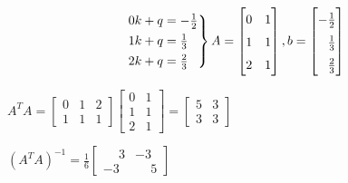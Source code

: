 \[
\begin{rcases*}
    0k + q = -\frac{1}{2} \\
    1k + q = \frac{1}{3} \\
    2k + q = \frac{2}{3}
\end{rcases*} 
A = 
\begin{bmatrix}
    0 & 1 \\
    1 & 1 \\
    2 & 1
\end{bmatrix},
b = 
\begingroup
    \renewcommand*{\arraystretch}{1.5}
    \begin{bmatrix}
        -\frac{1}{2} \\
        \phantom{-}\frac{1}{3} \\
        \phantom{-}\frac{2}{3}
    \end{bmatrix}
\endgroup
\]

$A^T A = 
\begin{bmatrix}
    0 & 1 & 2 \\
    1 & 1 & 1
\end{bmatrix}
\begin{bmatrix}
    0 & 1 \\
    1 & 1 \\
    2 & 1 
\end{bmatrix} =
\begin{bmatrix}
    5 & 3 \\
    3 & 3
\end{bmatrix}$

$(A^T A)^{-1} = \frac{1}{6}
\begin{bmatrix}
    \phantom{-}3 & -3 \\
    -3 & \phantom{-}5
\end{bmatrix}$

